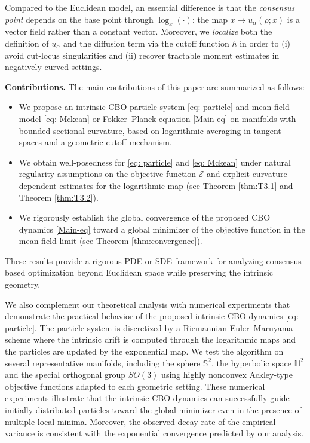 \documentclass[11pt]{amsart}
\newcommand{\bbs}{\mathbb S}
\begin{document}
Compared to the Euclidean model, an essential difference is that the \textit{consensus point} depends on the base point through $\log_x(\cdot)$: the map $x\mapsto u_\alpha(\rho;x)$ is a vector field rather than a constant vector. Moreover, we \emph{localize} both the definition of $u_\alpha$ and the diffusion term via the cutoff function $h$ in order to (i) avoid cut-locus singularities and (ii) recover tractable moment estimates in negatively curved settings.
\\


\medskip

\noindent\textbf{Contributions.}
The main contributions of this paper are summarized as follows:
\begin{itemize}
\item We propose an intrinsic CBO particle system \eqref{eq: particle} and mean-field model \eqref{eq: Mckean} or Fokker--Planck equation \eqref{Main-eq} on manifolds with bounded sectional curvature, based on logarithmic averaging in tangent spaces and a geometric cutoff mechanism.
\item We obtain  well-posedness for \eqref{eq: particle}  and  \eqref{eq: Mckean}  under natural regularity assumptions on the objective function $\mathcal{E}$ and explicit curvature-dependent estimates for the logarithmic map (see Theorem \ref{thm:T3.1} and Theorem \ref{thm:T3.2}). 
\item We rigorously establish the global convergence of the proposed CBO dynamics \eqref{Main-eq}  toward a global minimizer of the objective function in the mean-field limit (see Theorem \ref{thm:convergence}). 
\end{itemize}
These results provide a rigorous PDE or SDE framework for analyzing consensus-based optimization beyond Euclidean space while preserving the intrinsic geometry.

\medskip


We also complement our theoretical analysis with numerical experiments that demonstrate the practical behavior of the proposed intrinsic CBO dynamics \eqref{eq: particle}. The particle system is discretized by a Riemannian  Euler--Maruyama scheme where the intrinsic drift is computed through the logarithmic maps and the particles are updated by the exponential map. We test the algorithm on several representative manifolds, including the sphere $\bbs^2$, the hyperbolic space $\mathbb{H}^2$ and the special orthogonal group $SO(3)$ using highly nonconvex Ackley-type objective functions adapted to each geometric setting. These numerical experiments illustrate that the intrinsic CBO dynamics can successfully guide initially distributed particles toward the global minimizer even in the presence of multiple local minima. Moreover, the observed decay rate of the empirical variance is consistent with the exponential convergence predicted by our analysis. 
\end{document}
